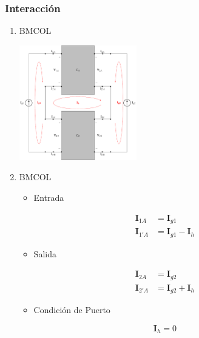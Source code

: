 \subsubsection{Interacción}
\label{sec:org9daf72f}
\begin{enumerate}
\item \hfill{}\textsc{BMCOL}
\label{sec:orgfd071da}

\includegraphics[height=5cm]{../figs/serie-serie-interaccion.pdf}

\item \hfill{}\textsc{BMCOL}
\label{sec:org009a6eb}
\begin{itemize}
\item Entrada
\end{itemize}
\begin{align*}
  \mathbf{I}_{1A} &= \mathbf{I}_{g1}\\
  \mathbf{I}_{1'A} &= \mathbf{I}_{g1} - \mathbf{I}_h
\end{align*}
\begin{itemize}
\item Salida
\end{itemize}
\begin{align*}
  \mathbf{I}_{2A} &= \mathbf{I}_{g2}\\
  \mathbf{I}_{2'A} &= \mathbf{I}_{g2}  + \mathbf{I}_h
\end{align*}
\begin{itemize}
\item Condición de Puerto
\end{itemize}
\[
\boxed{\mathbf{I}_h = 0}
\]
\end{enumerate}

